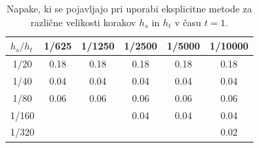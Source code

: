 \documentclass{article}
\theoremstyle{definition}
\begin{document}
 
\begin{table}[h!]
    \centering
    \begin{tabular}{cccccc}
    \toprule
    \multicolumn{1}{l}{\textbf{$h_s / h_t$}} & \textbf{1/625} & \textbf{1/1250} & \textbf{1/2500} & \textbf{1/5000} & \textbf{1/10000} \\\midrule
     1/20 &  0.18 &  0.18 &  0.18 &  0.18 &  0.18 \\
     1/40 &  0.04 &  0.04 &  0.04 &  0.04 &  0.04 \\
     1/80 &  0.06 &  0.06 &  0.06 &  0.06 &  0.06 \\
     1/160 & & & 0.04 &  0.04 &  0.04 \\
     1/320 & & & & & 0.02 \\
     \bottomrule
    \end{tabular}
    \caption{Napake, ki se pojavljajo pri uporabi eksplicitne metode za različne velikosti korakov $h_s$ in $h_t$ v času $t=1$.}
    \label{tabela:napake}
\end{table}

 
 
\end{document}
